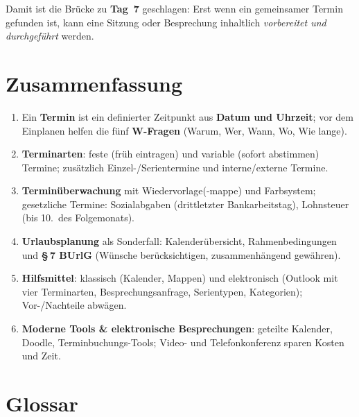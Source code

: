 \documentclass[11pt, a4paper]{article}
\begin{document}
Damit ist die Brücke zu \textbf{Tag~7} geschlagen: Erst wenn ein gemeinsamer Termin
gefunden ist, kann eine Sitzung oder Besprechung inhaltlich \emph{vorbereitet und
durchgeführt} werden.

\section{Zusammenfassung}

\begin{enumerate}
  \item Ein \textbf{Termin} ist ein definierter Zeitpunkt aus \textbf{Datum und Uhrzeit}; vor dem Einplanen helfen die fünf \textbf{W-Fragen} (Warum, Wer, Wann, Wo, Wie lange).
  \item \textbf{Terminarten}: feste (früh eintragen) und variable (sofort abstimmen) Termine; zusätzlich Einzel-/Serientermine und interne/externe Termine.
  \item \textbf{Terminüberwachung} mit Wiedervorlage(-mappe) und Farbsystem; gesetzliche Termine: Sozialabgaben (drittletzter Bankarbeitstag), Lohnsteuer (bis 10.\ des Folgemonats).
  \item \textbf{Urlaubsplanung} als Sonderfall: Kalenderübersicht, Rahmenbedingungen und \textbf{§\,7 BUrlG} (Wünsche berücksichtigen, zusammenhängend gewähren).
  \item \textbf{Hilfsmittel}: klassisch (Kalender, Mappen) und elektronisch (Outlook mit vier Terminarten, Besprechungsanfrage, Serientypen, Kategorien); Vor-/Nachteile abwägen.
  \item \textbf{Moderne Tools \& elektronische Besprechungen}: geteilte Kalender, Doodle, Terminbuchungs-Tools; Video- und Telefonkonferenz sparen Kosten und Zeit.
\end{enumerate}

\newpage

\section*{Glossar}



\end{document}

